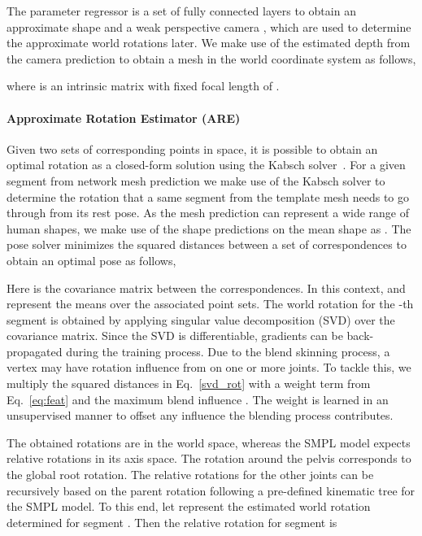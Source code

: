 \documentclass[10pt,twocolumn,letterpaper]{article}
\begin{document}
The parameter regressor is a set of fully connected layers to obtain an approximate shape  and a weak perspective camera , which are used to determine the approximate world rotations later. We make use of the estimated depth  from the camera prediction to obtain a mesh in the world coordinate system  as follows,

where  is an intrinsic matrix with fixed  focal length of .





\paragraph{Approximate Rotation Estimator (ARE)}
Given two sets of corresponding points in  space, it is possible to obtain an optimal rotation as a closed-form solution using the Kabsch solver~\cite{kabsch}. For a given segment from network mesh prediction  we make use of the Kabsch solver to determine the rotation that a same segment from the template mesh needs to go through from its rest pose. As the mesh prediction  can represent a wide range of human shapes, we make use of the shape predictions  on the mean shape as  . The pose solver minimizes the squared distances between a set of  correspondences to obtain an optimal pose as follows,

Here  is the covariance matrix between the correspondences. In this context,  and  represent the means over the associated point sets. The world rotation for the -th segment  is obtained by applying singular value decomposition (SVD) over the covariance matrix. Since the SVD is differentiable, gradients can be back-propagated during the training process. Due to the blend skinning  process, a vertex may have rotation influence from on one or more joints. To tackle this, we multiply the squared distances in Eq.~\eqref{svd_rot} with a weight term  from Eq.~\eqref{eq:feat} and the maximum blend influence . The weight is learned in an unsupervised manner to offset any influence the blending process contributes.   


The obtained rotations are in the world space, whereas the SMPL model expects relative rotations in its axis space. The rotation around the pelvis  corresponds to the global root rotation. The relative rotations for the other joints can be recursively based on the parent rotation following a pre-defined kinematic tree for the SMPL model. To this end, let  represent the estimated world rotation determined for segment . Then the relative rotation for segment  is
 
\end{document}
